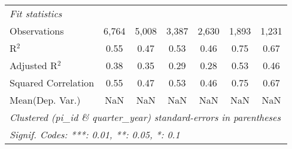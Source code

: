 \begin{tabular}{lcccccc}
   \midrule
   \emph{Fit statistics}\\
   Observations                                               & 6,764    & 5,008         & 3,387    & 2,630         & 1,893        & 1,231\\  
   R$^2$                                                      & 0.55     & 0.47          & 0.53     & 0.46          & 0.75         & 0.67\\  
   Adjusted R$^2$                                             & 0.38     & 0.35          & 0.29     & 0.28          & 0.53         & 0.46\\  
   Squared Correlation                                        & 0.55     & 0.47          & 0.53     & 0.46          & 0.75         & 0.67\\  
Mean(Dep. Var.) & NaN & NaN & NaN & NaN & NaN & NaN \\
   \midrule \midrule
   \multicolumn{7}{l}{\emph{Clustered (pi\_id \& quarter\_year) standard-errors in parentheses}}\\
   \multicolumn{7}{l}{\emph{Signif. Codes: ***: 0.01, **: 0.05, *: 0.1}}\\
\end{tabular}
\par\endgroup
